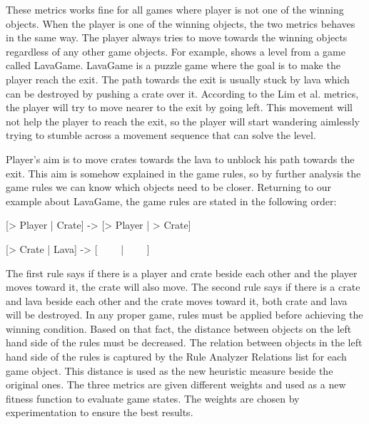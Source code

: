 \begin{hcfigure}
\begin{minipage}{0.45\textwidth}
  		\caption{Example of distance between player and winning objects metric}
  		\label{Figure:bestFS2}
	\end{minipage}
\end{hcfigure}

These metrics works fine for all games where player is not one of the winning objects. When the player is one of the winning objects, the two metrics behaves in the same way. The player always tries to move towards the winning objects regardless of any other game objects. For example,  shows a level from a game called LavaGame. LavaGame is a puzzle game where the goal is to make the player reach the exit. The path towards the exit is usually stuck by lava which can be destroyed by pushing a crate over it. According to the Lim et al. metrics, the player will try to move nearer to the exit by going left. This movement will not help the player to reach the exit, so the player will start wandering aimlessly trying to stumble across a movement sequence that can solve the level.


Player's aim is to move crates towards the lava to unblock his path towards the exit. This aim is somehow explained in the game rules, so by further analysis the game rules we can know which objects need to be closer. Returning to our example about LavaGame, the game rules are stated in the following order:
\begin{center}{[> Player | Crate] -> [> Player | > Crate]}\end{center}
\begin{center}{[> Crate | Lava] -> [ \ \ \ \ | \ \ \ \ ]}\end{center}
The first rule says if there is a player and crate beside each other and the player moves toward it, the crate will also move. The second rule says if there is a crate and lava beside each other and the crate moves toward it, both crate and lava will be destroyed. In any proper game, rules must be applied before achieving the winning condition. Based on that fact, the distance between objects on the left hand side of the rules must be decreased. The relation between objects in the left hand side of the rules is captured by the Rule Analyzer Relations list for each game object. This distance is used as the new heuristic measure beside the original ones. The three metrics are given different weights and used as a new fitness function to evaluate game states. The weights are chosen by experimentation to ensure the best results.\\\par

